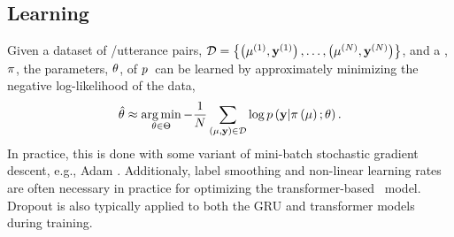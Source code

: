 \subsection{Learning}

Given a dataset of \meaningrepresentation/utterance pairs, $\mathcal{D} = \left\{\left(\mu^{(1)}, \mathbf{y}^{(1)}\right), \ldots, \left(\mu^{(N)},\mathbf{y}^{(N)} \right)\right\}$, 
and a 
\linearizationstrategy, $\pi$, the parameters, $\theta$, of $p$~can be learned by approximately
minimizing the negative log-likelihood of the data,
\[ \hat{\theta} \approx \operatorname*{arg\,min}_{\theta \in \Theta} -\frac{1}{N}\sum_{\left(\mu, \mathbf{y} \right) \in \mathcal{D}} 
    \log p\left(\mathbf{y}|\pi\left(\mu\right);\theta\right).
\]
In practice, this is done with some variant of mini-batch stochastic gradient descent, e.g., Adam
\citep{kingma2014adam}.
Additionaly, label smoothing \citep{szegedy2016} and non-linear learning rates are often 
necessary in practice for optimizing the transformer-based \sequencetosequence~model.
Dropout is also typically applied to both the GRU and transformer models during training. 
